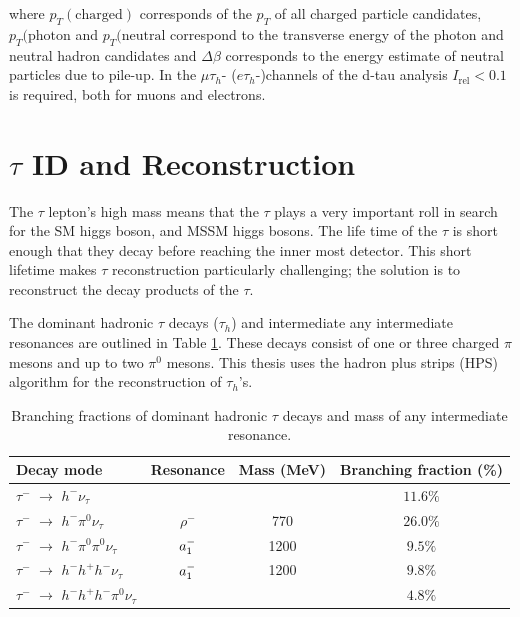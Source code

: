 where $p_{T}(\mathrm{charged})$ corresponds of the $p_{T}$ 
of all charged particle candidates, $p_{T}(\mathrm{photon}$
and $p_{T}(\mathrm{neutral}$ correspond to the transverse 
energy of the photon and neutral hadron candidates
and $\Delta\beta$ corresponds to the energy estimate of neutral particles due to pile-up.
In the $\mu\tau_{h}$- ($e\tau_{h}$-)channels of the d-tau 
analysis $I_{\mathrm{rel}}<0.1$ is required, both for muons and electrons. 

\section{$\tau$ ID and Reconstruction}
The $\tau$ lepton's high mass means that the $\tau$ plays a very important
roll in search for the SM higgs boson, and MSSM higgs bosons.
The life time of the $\tau$ is short enough that they decay before reaching the inner
most detector. This short lifetime makes $\tau$ reconstruction particularly challenging;
the solution is to reconstruct the decay products of the $\tau$. 

The dominant hadronic $\tau$ decays ($\tau_{h}$) 
and intermediate any intermediate resonances are 
outlined in Table \ref{tab:decay_modes}. 
These decays consist of one or three charged $\pi$ mesons and up to two $\pi^{0}$ mesons.
This thesis uses the hadron plus strips (HPS) algorithm for the reconstruction of 
$\tau_{h}$'s. %
\begin{table}[b]
\begin{center}
\begin{tabular}{|l|c|c|c|}
\hline
Decay mode & Resonance & Mass (MeV) &  Branching fraction (\%) \\
\hline
$\tau^{-}$  $\rightarrow $  $h^{-} \nu_{\tau}$ &  &  & $11.6\%$ \\
$\tau^{-}$  $\rightarrow $  $h^{-} \pi^{0}  \nu_{\tau}$ & $\rho^{-}$ & 770 & $26.0\%$ \\
$\tau^{-}$  $\rightarrow $  $h^{-} \pi^{0}\pi^{0}  \nu_{\tau}$ & $a_{\rm{1}}^{-}$ & 1200 & $9.5\%$ \\
$\tau^{-}$  $\rightarrow $  $h^{-} h^{+} h^{-} \nu_{\tau}$ & $a_{\rm{1}}^{-}$  & 1200 & $9.8\%$ \\
$\tau^{-}$  $\rightarrow $  $h^{-} h^{+} h^{-}\pi^{0}  \nu_{\tau}$ & & & $4.8\%$ \\
      \hline
\end{tabular}
\caption{
   Branching fractions of dominant hadronic $\tau$ decays and mass of any intermediate resonance. 
   }
\label{tab:decay_modes}
\end{center}
\end{table}

